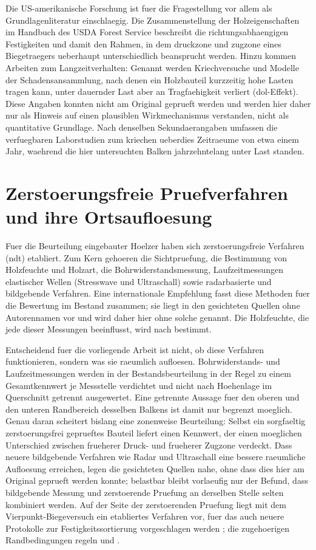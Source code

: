Die US-amerikanische Forschung ist fuer die Fragestellung vor allem als
Grundlagenliteratur einschlaegig. Die Zusammenstellung der Holzeigenschaften im
Handbuch des USDA Forest Service \parencite{usdaTimberBridge} beschreibt die
richtungsabhaengigen Festigkeiten und damit den Rahmen, in dem
\gls{druckzone} und \gls{zugzone} eines Biegetraegers ueberhaupt
unterschiedlich beansprucht werden. Hinzu kommen Arbeiten zum Langzeitverhalten:
Genannt werden Kriechversuche und Modelle der Schadensansammlung, nach denen
ein Holzbauteil kurzzeitig hohe Lasten tragen kann, unter dauernder Last aber
an Tragfaehigkeit verliert (\acrshort{dol}-Effekt). Diese Angaben konnten nicht
am Original geprueft werden und werden hier daher nur als Hinweis auf einen
plausiblen Wirkmechanismus verstanden, nicht als quantitative Grundlage. Nach
denselben Sekundaerangaben umfassen die verfuegbaren Laborstudien zum
\gls{kriechen} ueberdies Zeitraeume von etwa einem Jahr, waehrend die hier
untersuchten Balken jahrzehntelang unter Last standen.

\section{Zerstoerungsfreie Pruefverfahren und ihre Ortsaufloesung}
\label{sec:lit-ndt}

Fuer die Beurteilung eingebauter Hoelzer haben sich zerstoerungsfreie Verfahren
(\acrshort{ndt}) etabliert. Zum Kern gehoeren die Sichtpruefung, die Bestimmung
von Holzfeuchte und Holzart, die Bohrwiderstandsmessung, Laufzeitmessungen
elastischer Wellen (Stresswave und Ultraschall) sowie radarbasierte und
bildgebende Verfahren. Eine internationale Empfehlung fasst diese Methoden fuer
die Bewertung im Bestand zusammen; sie liegt in den gesichteten Quellen ohne
Autorennamen vor und wird daher hier ohne solche genannt. Die Holzfeuchte, die
jede dieser Messungen beeinflusst, wird nach \textcite{din13183} bestimmt.

Entscheidend fuer die vorliegende Arbeit ist nicht, ob diese Verfahren
funktionieren, sondern was sie raeumlich aufloesen. Bohrwiderstands- und
Laufzeitmessungen werden in der Bestandsbeurteilung in der Regel zu einem
Gesamtkennwert je Messstelle verdichtet und nicht nach Hoehenlage im
Querschnitt getrennt ausgewertet. Eine getrennte Aussage fuer den oberen und
den unteren Randbereich desselben Balkens ist damit nur begrenzt moeglich.
Genau daran scheitert bislang eine zonenweise Beurteilung: Selbst ein
sorgfaeltig zerstoerungsfrei geprueftes Bauteil liefert einen Kennwert, der
einen moeglichen Unterschied zwischen frueherer Druck- und frueherer Zugzone
verdeckt. Dass neuere bildgebende Verfahren wie Radar und Ultraschall eine
bessere raeumliche Aufloesung erreichen, legen die gesichteten Quellen nahe,
ohne dass dies hier am Original geprueft werden konnte; belastbar bleibt
vorlaeufig nur der Befund, dass bildgebende Messung und zerstoerende Pruefung
an derselben Stelle selten kombiniert werden. Auf der Seite der zerstoerenden
Pruefung liegt mit dem Vierpunkt-Biegeversuch ein etabliertes Verfahren vor,
fuer das auch neuere Protokolle zur Festigkeitssortierung vorgeschlagen werden
\parencite{fourpoint}; die zugehoerigen Randbedingungen regeln
\textcite{en408} und \textcite{en384}.


